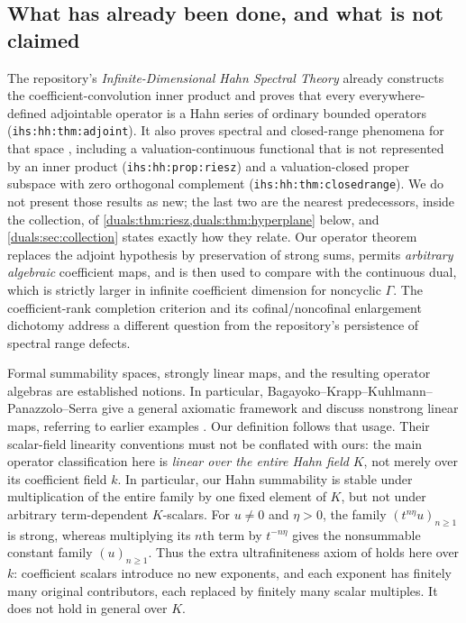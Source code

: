 \documentclass[11pt,letterpaper]{article}
\numberwithin{equation}{section}
\theoremstyle{definition}
\theoremstyle{remark}
\newcommand{\ihs}[1]{\texttt{ihs:#1}}
\begin{document}
\subsection{What has already been done, and what is not claimed}
The repository's \emph{Infinite-Dimensional Hahn Spectral Theory}
already constructs the coefficient-convolution inner product and proves
that every everywhere-defined adjointable operator is a Hahn series of
ordinary bounded operators (\ihs{hh:thm:adjoint}). It also proves spectral
and closed-range phenomena for that space \cite{RepoSpectral}, including a
valuation-continuous functional that is not represented by an inner
product (\ihs{hh:prop:riesz}) and a valuation-closed proper subspace with
zero orthogonal complement (\ihs{hh:thm:closedrange}). We do not present
those results as new; the last two are the nearest predecessors, inside
the collection, of \cref{duals:thm:riesz,duals:thm:hyperplane} below, and
\cref{duals:sec:collection} states exactly how they relate. Our operator theorem replaces the adjoint hypothesis by
preservation of strong sums, permits \emph{arbitrary algebraic}
coefficient maps, and is then used to compare with the continuous dual,
which is strictly larger in infinite coefficient dimension for noncyclic
$\Gamma$. The coefficient-rank completion criterion and its
cofinal/noncofinal enlargement dichotomy address a different question
from the repository's persistence of spectral range defects.

Formal summability spaces, strongly linear maps, and the resulting
operator algebras are established notions. In particular,
Bagayoko--Krapp--Kuhlmann--Panazzolo--Serra give a general axiomatic
framework and discuss nonstrong linear maps, referring to earlier
examples \cite[Section~1.3]{BKKPS}. Our definition follows that usage. Their scalar-field
linearity conventions must not be conflated with ours: the main operator
classification here is \emph{linear over the entire Hahn field} $K$,
not merely over its coefficient field $k$. In particular, our Hahn
summability is stable under multiplication of the entire family by
one fixed element of $K$, but not under arbitrary term-dependent
$K$-scalars. For $u\ne0$ and $\eta>0$, the family
$(t^{n\eta}u)_{n\ge1}$ is strong, whereas multiplying its $n$th
term by $t^{-n\eta}$ gives the nonsummable constant family $(u)_{n\ge1}$.
Thus the extra ultrafiniteness axiom of \cite[Definition~1.1]{BKKPS}
holds here over $k$: coefficient scalars introduce no new exponents,
and each exponent has finitely many original contributors, each replaced
by finitely many scalar multiples. It does not hold in general over $K$.
\end{document}
